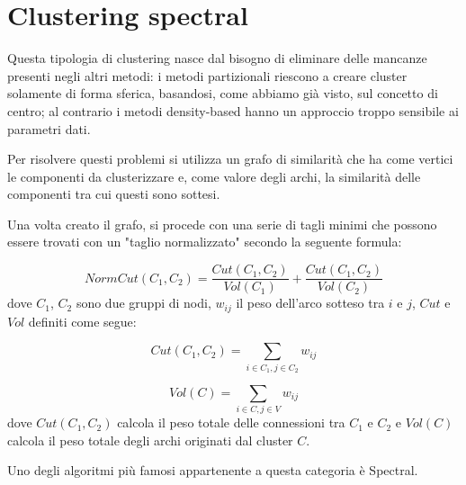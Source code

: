\section{Clustering spectral}
	Questa tipologia di clustering nasce dal bisogno di eliminare delle mancanze presenti negli altri metodi: i metodi partizionali riescono a creare cluster solamente di forma sferica, basandosi, come abbiamo già visto, sul concetto di centro; al contrario i metodi density-based hanno un approccio troppo sensibile ai parametri dati.

	Per risolvere questi problemi si utilizza un grafo di similarità che ha come vertici le componenti da clusterizzare e, come valore degli archi, la similarità delle componenti tra cui questi sono sottesi.

	Una volta creato il grafo, si procede con una serie di tagli minimi che possono essere trovati con un "taglio normalizzato" secondo la seguente formula:

	\begin{equation*}
		NormCut(C_1, C_2) =  \frac{Cut(C_1, C_2)}{Vol(C_1)} + \frac{Cut(C_1, C_2)}{Vol(C_2)}
	\end{equation*}
	dove $C_1$, $C_2$ sono due gruppi di nodi,  $w_{ij}$ il peso dell'arco sotteso tra $i$ e $j$, $Cut$ e $Vol$ definiti come segue:

	\begin{equation*}
		Cut(C_1, C_2) = \sum_{i \in C_1, j \in C_2} {w_{ij}}
	\end{equation*}

	\begin{equation*}
		Vol(C) = \sum_{i \in C, j \in V} {w_{ij}}
	\end{equation*}
	dove $Cut(C_1, C_2)$ calcola il peso totale delle connessioni tra $C_1$ e $C_2$ e $Vol(C)$ calcola il peso totale degli archi originati dal cluster $C$.

	Uno degli algoritmi più famosi appartenente a questa categoria è Spectral\cite{spectral}.